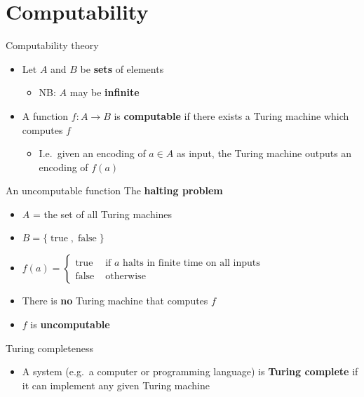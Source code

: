 \part{Computability}
\frame{\partpage}

\begin{frame}{Computability theory}
	\begin{itemize}
		\pause\item Let $A$ and $B$ be \textbf{sets} of elements
			\begin{itemize}
				\pause\item NB: $A$ may be \textbf{infinite}
			\end{itemize}
		\pause\item A function $f : A \to B$ is \textbf{computable} if there exists a Turing machine
			which computes $f$
			\begin{itemize}
				\pause\item I.e.\ given an encoding of $a \in A$ as input, the Turing machine outputs an encoding of
					$f(a)$
			\end{itemize}
	\end{itemize}
\end{frame}

\begin{frame}{An uncomputable function}
	The \textbf{halting problem}
	\begin{itemize}
		\pause\item $A$ = the set of all Turing machines
		\pause\item $B = \{ \operatorname{true}, \operatorname{false} \}$
		\pause\item $f(a) = \begin{cases}
			\operatorname{true} & \text{ if $a$ halts in finite time on all inputs} \\
			\operatorname{false} & \text{ otherwise}
		\end{cases}$
		\pause\item There is \textbf{no} Turing machine that computes $f$
		\pause\item $f$ is \textbf{uncomputable}
	\end{itemize}
\end{frame}

\begin{frame}{Turing completeness}
	\begin{itemize}
		\pause\item A system (e.g.\ a computer or programming language) is \textbf{Turing complete}
			if it can implement any given Turing machine
	\end{itemize}
\end{frame}

